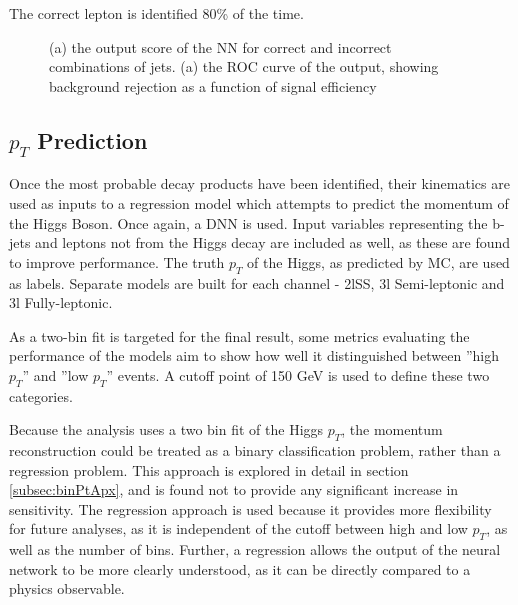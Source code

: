 The correct lepton is identified 80\% of the time.

\begin{figure}[h!]
  \label{fig:higgs3lFresults}
  \caption{(a) the output score of the NN for correct and incorrect combinations of jets. (a) the ROC curve of the output, showing background rejection as a function of signal efficiency}
\end{figure} 


\subsection{$p_T$ Prediction}
\label{sec:ptReco}

Once the most probable decay products have been identified, their kinematics are used as inputs to a regression model which attempts to predict the momentum of the Higgs Boson. Once again, a DNN is used. Input variables representing the b-jets and leptons not from the Higgs decay are included as well, as these are found to improve performance. The truth $p_T$ of the Higgs, as predicted by MC, are used as labels. Separate models are built for each channel - 2lSS, 3l Semi-leptonic and 3l Fully-leptonic.

As a two-bin fit is targeted for the final result, some metrics evaluating the performance of the models aim to show how well it distinguished between ''high $p_T$'' and ''low $p_T$'' events. A cutoff point of 150 GeV is used to define these two categories.

Because the analysis uses a two bin fit of the Higgs $p_T$, the momentum reconstruction could be treated as a binary classification problem, rather than a regression problem. This approach is explored in detail in section \ref{subsec:binPtApx}, and is found not to provide any significant increase in sensitivity. The regression approach is used because it provides more flexibility for future analyses, as it is independent of the cutoff between high and low $p_T$, as well as the number of bins. Further, a regression allows the output of the neural network to be more clearly understood, as it can be directly compared to a physics observable.

